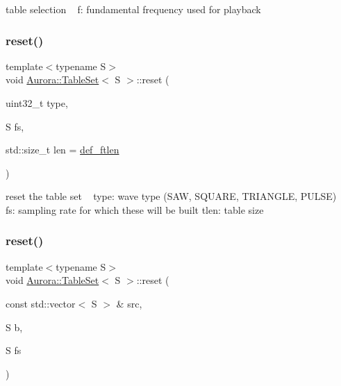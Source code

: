 table selection ~\newline
f\+: fundamental frequency used for playback \mbox{\label{class_aurora_1_1_table_set_ac2c945c49d53f60fd909dc771a6ff7e5}} 
\subsubsection{\texorpdfstring{reset()}{reset()}\hspace{0.1cm}{\footnotesize\ttfamily [1/2]}}
{\footnotesize\ttfamily template$<$typename S$>$ \\
void \hyperlink{class_aurora_1_1_table_set}{Aurora\+::\+Table\+Set}$<$ S $>$\+::reset (\begin{DoxyParamCaption}\item[{uint32\+\_\+t}]{type,  }\item[{S}]{fs,  }\item[{std\+::size\+\_\+t}]{len = {\ttfamily \hyperlink{namespace_aurora_a14dabfd9feedfa09c0e6f86d2627f006}{def\+\_\+ftlen}} }\end{DoxyParamCaption})\hspace{0.3cm}{\ttfamily [inline]}}

reset the table set ~\newline
type\+: wave type (S\+AW, S\+Q\+U\+A\+RE, T\+R\+I\+A\+N\+G\+LE, P\+U\+L\+SE) ~\newline
fs\+: sampling rate for which these will be built tlen\+: table size \mbox{\label{class_aurora_1_1_table_set_afec852dca45285ec57b6a4a97dffac36}} 
\subsubsection{\texorpdfstring{reset()}{reset()}\hspace{0.1cm}{\footnotesize\ttfamily [2/2]}}
{\footnotesize\ttfamily template$<$typename S$>$ \\
void \hyperlink{class_aurora_1_1_table_set}{Aurora\+::\+Table\+Set}$<$ S $>$\+::reset (\begin{DoxyParamCaption}\item[{const std\+::vector$<$ S $>$ \&}]{src,  }\item[{S}]{b,  }\item[{S}]{fs }\end{DoxyParamCaption})\hspace{0.3cm}{\ttfamily [inline]}}

